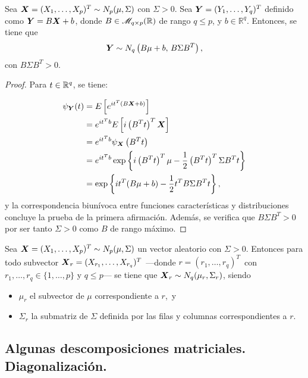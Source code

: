  
    \begin{nprop} \label{linealesrangomaximo}
      Sea $\boldsymbol{X} = (X_1,\dots,X_p)^T \sim N_p(\mu,\Sigma)$ con $\Sigma > 0$. Sea $\boldsymbol{Y} = (Y_1,\dots,Y_q)^T$ definido como $\boldsymbol{Y} = B\boldsymbol{X} + b$, donde $B\in \mathscr{M}_{q\times p}(\mathbb{R})$ de rango $q \leq p$, y $b \in \mathbb R^q$. Entonces, se tiene que
      \[
        \boldsymbol{Y} \sim N_q\left(B\mu+b,\, B\Sigma B^T\right),
      \]
      con $B\Sigma B^T > 0$.
    \end{nprop}
    \begin{proof}
      Para $t\in \mathbb{R}^q$, se tiene:

      \[
      \begin{split}
        \psi_{\boldsymbol{Y}}(t) & = E\left[ e^{it^T(B\boldsymbol{X} + b)} \right] \\
        & = e^{it^Tb} E\left[ i\left(B^Tt\right)^T\boldsymbol{X} \right] \\
        & = e^{it^Tb} \psi_{\boldsymbol{X}}\left(B^Tt\right) \\
        & = e^{it^Tb} \exp\left\{i\left(B^Tt\right)^T \mu- \frac{1}{2}\left(B^Tt\right)^T \Sigma B^Tt\right\} \\
        & = \exp\left\{it^T(B\mu + b) - \frac{1}{2}t^T B\Sigma B^Tt\right\},
      \end{split}
      \]
      y la correspondencia biunívoca entre funciones características y distribuciones concluye la prueba de la primera afirmación.
      Además, se verifica que $B\Sigma B^T > 0$ por ser tanto $\Sigma > 0$ como $B$ de rango máximo.
    \end{proof}

    \begin{ncor}[Marginalización]
      Sea $\boldsymbol{X} = (X_1,\dots,X_p)^T \sim N_p(\mu,\Sigma)$ un vector aleatorio con $\Sigma > 0$. Entonces para todo subvector $\boldsymbol{X}_r = (X_{r_1},\dots, X_{r_q})^T$ —donde $r = (r_1,\dots,r_q)^T$\, con $r_1,\dots,r_q \in \{1,\dots,p\}$ y $q \leq p$— se tiene que $\boldsymbol{X}_r \sim N_q(\mu_r, \Sigma_r)$, siendo
      \begin{itemize}
      \item $\mu_r$ el subvector de $\mu$ correspondiente a $r$,\, y
        \item $\Sigma_r$ la submatriz de $\Sigma$ definida por las filas y columnas correspondientes a $r$.
      \end{itemize}
    \end{ncor}

\subsection{Algunas descomposiciones matriciales. Diagonalización.}
    
